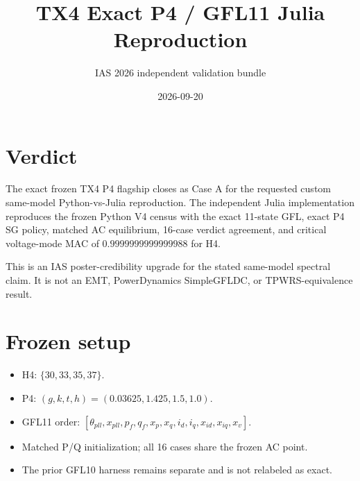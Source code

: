 \documentclass[10pt]{article}
\title{TX4 Exact P4 / GFL11 Julia Reproduction}
\author{IAS 2026 independent validation bundle}
\date{2026-09-20}
\begin{document}
\maketitle

\section*{Verdict}

The exact frozen TX4 P4 flagship closes as Case A for the requested custom same-model Python-vs-Julia reproduction. The independent Julia implementation reproduces the frozen Python V4 census with the exact 11-state GFL, exact P4 SG policy, matched AC equilibrium, 16-case verdict agreement, and critical voltage-mode MAC of $0.9999999999999988$ for H4.

This is an IAS poster-credibility upgrade for the stated same-model spectral claim. It is not an EMT, PowerDynamics SimpleGFLDC, or TPWRS-equivalence result.

\section*{Frozen setup}
\begin{itemize}
  \item H4: $\{30,33,35,37\}$.
  \item P4: $(g,k,t,h)=(0.03625,1.425,1.5,1.0)$.
  \item GFL11 order: $[\theta_{pll},x_{pll},p_f,q_f,x_p,x_q,i_d,i_q,x_{id},x_{iq},x_v]$.
  \item Matched P/Q initialization; all 16 cases share the frozen AC point.
  \item The prior GFL10 harness remains separate and is not relabeled as exact.
\end{itemize}
\end{document}
